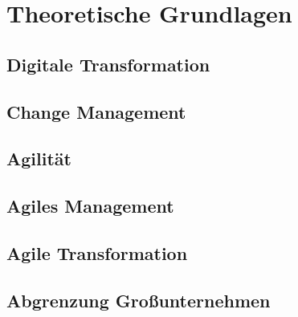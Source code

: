 \chapter{Theoretische Grundlagen}
\label{background}


\todots

\section{Digitale Transformation}

\todots

\section{Change Management}

\todots

\section{Agilität}

\todots

\section{Agiles Management}

\todots

\section{Agile Transformation}

\todots

\section{Abgrenzung Großunternehmen}